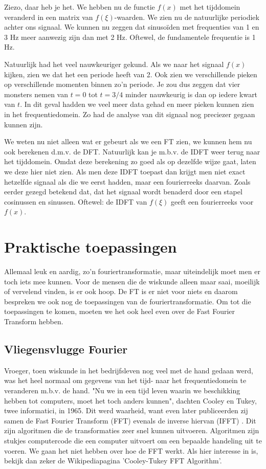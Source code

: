 \documentclass[11pt,fleqn]{book} %
\begin{document}
Ziezo, daar heb je het. We hebben nu de functie $f(x)$ met het tijddomein veranderd in een matrix van $f(\xi)$-waarden. We zien nu de natuurlijke periodiek achter ons signaal. We kunnen nu zeggen dat sinusoïden met frequenties van 1 en 3 Hz meer aanwezig zijn dan met 2 Hz. Oftewel, de fundamentele frequentie is 1 Hz.

Natuurlijk had het veel nauwkeuriger gekund. Als we naar het signaal $f(x)$ kijken, zien we dat het een periode heeft van 2. Ook zien we verschillende pieken op verschillende momenten binnen zo’n periode. Je zou dus zeggen dat vier monsters nemen van $t=0$ tot $t=3/4$ minder nauwkeurig is dan op iedere kwart van $t$. In dit geval hadden we veel meer data gehad en meer pieken kunnen zien in het frequentiedomein. Zo had de analyse van dit signaal nog preciezer gegaan kunnen zijn.

We weten nu niet alleen wat er gebeurt als we een FT zien, we kunnen hem nu ook berekenen d.m.v. de DFT. Natuurlijk kan je m.b.v. de IDFT weer terug naar het tijddomein. Omdat deze berekening zo goed als op dezelfde wijze gaat, laten we deze hier niet zien. Als men deze IDFT toepast dan krijgt men niet exact hetzelfde signaal als die we eerst hadden, maar een fourierreeks daarvan. Zoals eerder gezegd  betekend dat, dat het signaal wordt benaderd door een stapel cosinussen en sinussen. Oftewel: de IDFT van $f(\xi)$ geeft een fourierreeks voor $f(x)$.

\section{Praktische toepassingen}
Allemaal leuk en aardig, zo’n fouriertransformatie, maar uiteindelijk moet men er toch iets mee kunnen. Voor de mensen die de wiskunde alleen maar saai, moeilijk of vervelend vinden, is er ook hoop. De FT is er niet voor niets en daarom bespreken we ook nog de toepassingen van de fouriertransformatie. Om tot die toepassingen te komen, moeten we het ook heel even over de Fast Fourier Transform hebben.

\subsection{Vliegensvlugge Fourier}
Vroeger, toen wiskunde in het bedrijfsleven nog veel met de hand gedaan werd, was het heel normaal om gegevens van het tijd- naar het frequentiedomein te veranderen m.b.v. de hand. "Nu we in een tijd leven waarin we beschikking hebben tot computers, moet het toch anders kunnen", dachten Cooley en Tukey, twee informatici, in 1965. Dit werd waarheid, want even later publiceerden zij samen de Fast Fourier Transform (FFT) evenals de inverse hiervan (IFFT) \cite{fft}. Dit zijn algoritmen die de transformaties zeer snel kunnen uitvoeren. Algoritmen zijn stukjes computercode die een computer uitvoert om een bepaalde handeling uit te voeren. We gaan het niet hebben over hoe de FFT werkt. Als hier interesse in is, bekijk dan zeker de Wikipediapagina 'Cooley-Tukey FFT Algorithm'.
\end{document}
